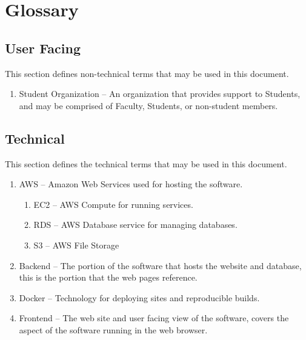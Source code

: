 \newpage %
\section{Glossary}
	\subsection{User Facing}
	This section defines non-technical terms that may be used in this document.
	\begin{enumerate}[leftmargin=3\parindent]
		\item Student Organization -- An organization that provides support to Students, and may be comprised of Faculty, Students, or non-student members.
	\end{enumerate}

	\subsection{Technical}
	This section defines the technical terms that may be used in this document.
	\begin{enumerate}[leftmargin=3\parindent]
		\item AWS -- Amazon Web Services used for hosting the software.
		\begin{enumerate}[leftmargin=3\parindent]
			\item EC2 -- AWS Compute for running services.
			\item RDS -- AWS Database service for managing databases.
			\item S3 -- AWS File Storage
		\end{enumerate}
		\item Backend -- The portion of the software that hosts the website and database, this is the portion that the web pages reference.
		\item Docker -- Technology for deploying sites and reproducible builds.
		\item Frontend -- The web site and user facing view of the software, covers the aspect of the software running in the web browser.
	\end{enumerate}

	\documentsGlossary



